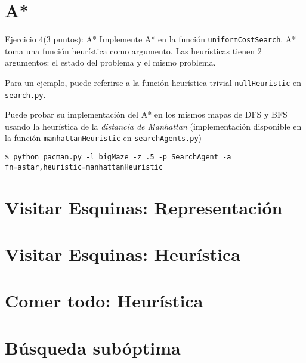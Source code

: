 \documentclass[10pt]{beamer}
\begin{document}
\section{A*}
\begin{frame}[fragile]{Ejercicio 4(3 puntos): A*}
Implemente A* en la función \texttt{uniformCostSearch}. A* toma una función heurística como 
argumento. Las heurísticas tienen 2 argumentos: el estado del problema y el mismo problema.

Para un ejemplo, puede referirse a la función heurística trivial \texttt{nullHeuristic} en
\texttt{search.py}.

Puede probar su implementación del A* en los mismos mapas de DFS y BFS usando la heurística 
de la \textit{distancia de Manhattan} (implementación disponible en la función \texttt{manhattanHeuristic}
en \texttt{searchAgents.py})

\begin{lstlisting}
$ python pacman.py -l bigMaze -z .5 -p SearchAgent -a fn=astar,heuristic=manhattanHeuristic
\end{lstlisting}

\end{frame}


\section{Visitar Esquinas: Representación}
\section{Visitar Esquinas: Heurística}
\section{Comer todo: Heurística}
\section{Búsqueda subóptima}
\end{document}
